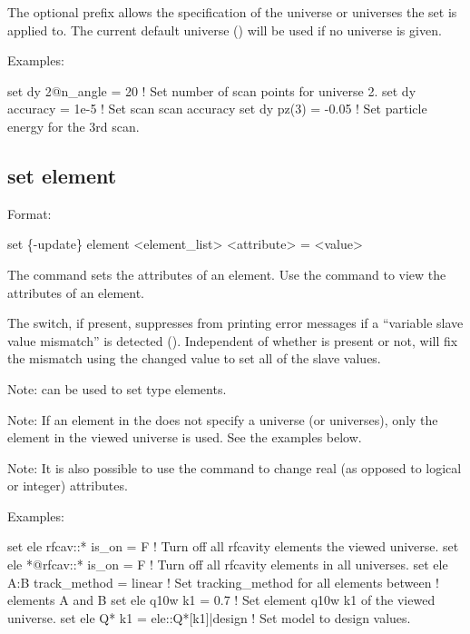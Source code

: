 {{The optional  prefix allows the specification of the universe or universes the set is applied
to. The current default universe () will be used if no universe is given.

Examples:
\begin{example}
  set dy 2@n_angle = 20   ! Set number of scan points for universe 2.
  set dy accuracy = 1e-5  ! Set scan scan accuracy
  set dy pz(3) = -0.05    ! Set particle energy for the 3rd scan.
\end{example}


\subsection{set element}
\label{s:set.element}

Format:
\begin{example}
  set \{-update\} element <element_list> <attribute> = <value>
\end{example}

The  command sets the attributes of an element. Use the 
command to view the attributes of an element.

The  switch, if present, suppresses \tao from printing error messages if a ``variable
slave value mismatch'' is detected (). Independent of whether  is
present or not, \tao will fix the mismatch using the changed value to set all of the slave values.

Note:  can be used to set  type elements.

Note: If an element in the  does not specify a universe (or universes),
only the element in the viewed universe is used. See the examples below.

Note: It is also possible to use the  command to change real (as opposed to
logical or integer) attributes.

Examples:
\begin{example}
  set ele rfcav::* is_on = F         ! Turn off all rfcavity elements the viewed universe.
  set ele *@rfcav::* is_on = F       ! Turn off all rfcavity elements in all universes.
  set ele A:B track_method = linear  ! Set tracking_method for all elements between 
                                     !   elements A and B
  set ele q10w k1 = 0.7              ! Set element q10w k1 of the viewed universe.
  set ele Q* k1 = ele::Q*[k1]|design ! Set model to design values.
\end{example}

}}
